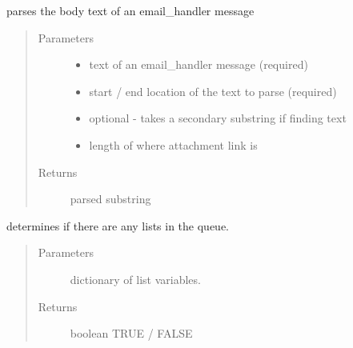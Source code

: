 \documentclass[letterpaper,10pt,english]{sphinxmanual}
\begin{document}
\begin{fulllineitems}
\label{\detokenize{index:ListManagement.utility.email_helper.info_parser}}
parses the body text of an email\_handler message
\begin{quote}\begin{description}
\item[{Parameters}] \leavevmode\begin{itemize}
\item {} 
 \textendash{} text of an email\_handler message (required)

\item {} 
 \textendash{} start / end location of the text to parse (required)

\item {} 
 \textendash{} optional - takes a secondary substring if finding text

\item {} 
 \textendash{} length of where attachment link is

\end{itemize}

\item[{Returns}] \leavevmode
parsed substring

\end{description}\end{quote}

\end{fulllineitems}


\begin{fulllineitems}
\label{\detokenize{index:ListManagement.utility.email_helper.lists_in_queue}}
determines if there are any lists in the queue.
\begin{quote}\begin{description}
\item[{Parameters}] \leavevmode
{} \textendash{} dictionary of list variables.

\item[{Returns}] \leavevmode
boolean TRUE / FALSE

\end{description}\end{quote}

\end{fulllineitems}
\end{document}
